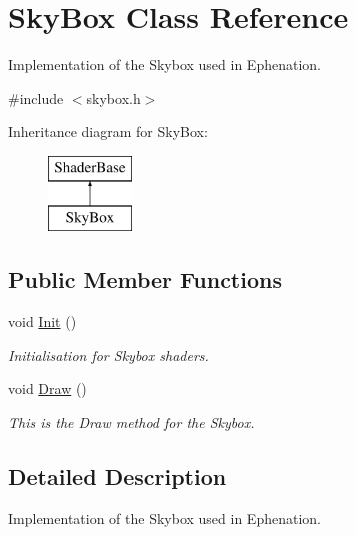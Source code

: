 \hypertarget{classSkyBox}{\section{\-Sky\-Box \-Class \-Reference}
\label{classSkyBox}
}


\-Implementation of the \-Skybox used in \-Ephenation.  




{\ttfamily \#include $<$skybox.\-h$>$}

\-Inheritance diagram for \-Sky\-Box\-:\begin{figure}[H]
\begin{center}
\leavevmode
\includegraphics[height=2.000000cm]{classSkyBox}
\end{center}
\end{figure}
\subsection*{\-Public \-Member \-Functions}
\begin{DoxyCompactItemize}
\item 
\hypertarget{classSkyBox_a250406233a0f644319952fa693bd5b80}{void \hyperlink{classSkyBox_a250406233a0f644319952fa693bd5b80}{\-Init} ()}\label{classSkyBox_a250406233a0f644319952fa693bd5b80}

\begin{DoxyCompactList}\small\item\em \-Initialisation for \-Skybox shaders. \end{DoxyCompactList}\item 
void \hyperlink{classSkyBox_ab9db46f2e34683cae517ba97a44aee9e}{\-Draw} ()
\begin{DoxyCompactList}\small\item\em \-This is the \-Draw method for the \-Skybox. \end{DoxyCompactList}\end{DoxyCompactItemize}


\subsection{\-Detailed \-Description}
\-Implementation of the \-Skybox used in \-Ephenation. 

